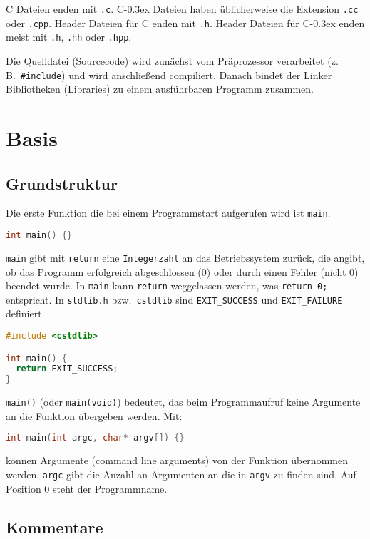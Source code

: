 \documentclass[10pt,twocolumn]{scrartcl}
\newcommand*\cpp{C\kern-0.3ex\raisebox{0.17ex}{\texttt{+\kern-0.3ex+}}}
\begin{document}
C Dateien enden mit \lstinline|.c|. \cpp{} Dateien haben üblicherweise die
Extension \lstinline|.cc| oder \lstinline|.cpp|. Header Dateien für C enden mit
\lstinline|.h|. Header Dateien für \cpp{} enden meist mit \lstinline|.h|,
\lstinline|.hh| oder \lstinline|.hpp|.

Die Quelldatei (Sourcecode) wird zunächst vom Präprozessor verarbeitet (z.\,B.\
\lstinline|#include|) und wird anschließend compiliert. Danach bindet der Linker
Bibliotheken (Libraries) zu einem ausführbaren Programm zusammen.

\section{Basis}
\label{sec:einleitung}

\subsection{Grundstruktur}

Die erste Funktion die bei einem Programmstart aufgerufen wird ist
\lstinline|main|.
\begin{lstlisting}[language=C++]
int main() {}
\end{lstlisting}
\lstinline|main| gibt mit \lstinline|return| eine \lstinline|Integerzahl| an das
Betriebssystem zurück, die angibt, ob das Programm erfolgreich abgeschlossen (0)
oder durch einen Fehler (nicht 0) beendet wurde. In \lstinline|main| kann
\lstinline|return| weggelassen werden, was \lstinline|return 0;| entspricht. In
\lstinline|stdlib.h| bzw.\ \lstinline|cstdlib| sind \lstinline|EXIT_SUCCESS| und
\lstinline|EXIT_FAILURE| definiert.
\begin{lstlisting}[language=C++]
#include <cstdlib>

int main() {
  return EXIT_SUCCESS;
}
\end{lstlisting}
\lstinline|main()| (oder \lstinline|main(void)|) bedeutet, das beim
Programmaufruf keine Argumente an die Funktion übergeben werden. Mit:
\begin{lstlisting}[language=C++]
int main(int argc, char* argv[]) {}
\end{lstlisting}
können Argumente (command line arguments) von der Funktion übernommen werden.
\lstinline|argc| gibt die Anzahl an Argumenten an die in \lstinline|argv| zu
finden sind. Auf Position 0 steht der Programmname.

\subsection{Kommentare}
\end{document}
